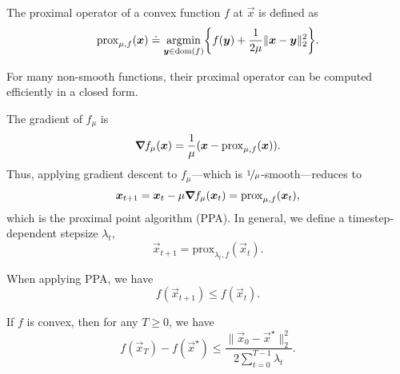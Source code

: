 \begin{definition}
    The proximal operator of a convex function $f$ at $\vec{x}$ is defined as \[
        \mathrm{prox}_{\mu,f}(\vec{x}) \doteq \argmin_{\vec{y} \in \dom{f}} \lft\{ f(\vec{y}) + \frac{1}{2 \mu} \| \vec{x} - \vec{y} \|_2^2 \rgt\}.
    \]
\end{definition}
For many non-smooth functions, their proximal operator can be computed efficiently in a closed form.

The gradient of $f_{\mu}$ is \[
    \bm{\nabla}_{\! } f_{\mu}(\bm{x}) = \frac{1}{\mu} (\bm{x} - \mathrm{prox}_{\mu, f}(\bm{x})).
\]
Thus, applying gradient descent to $f_{\mu}$---which is $\nicefrac{1}{\mu}$-smooth---reduces to \[
    \bm{x}_{t+1} = \bm{x}_t - \mu \bm{\nabla}_{\! } f_{\mu}(\bm{x}_t) = \mathrm{prox}_{\mu, f}(\bm{x}_t),
\]
which is the proximal point algorithm (PPA). In general, we define a timestep-dependent stepsize
$\lambda_t$, \[
    \vec{x}_{t+1} = \mathrm{prox}_{\lambda_t, f}(\vec{x}_t).
\]

\begin{lemma}
    \label{lem:ppa-descent}

    When applying PPA, we have \[
        f(\vec{x}_{t+1}) \leq f(\vec{x}_t).
    \]
\end{lemma}

\begin{theorem}
    If $f$ is convex, then for any $T \geq 0$, we have \[
        f(\vec{x}_T) - f(\vec{x}^\star) \leq \frac{\| \vec{x}_0 - \vec{x}^\star \|_2^2}{2 \sum_{t=0}^{T-1} \lambda_t}.
    \]
\end{theorem}

